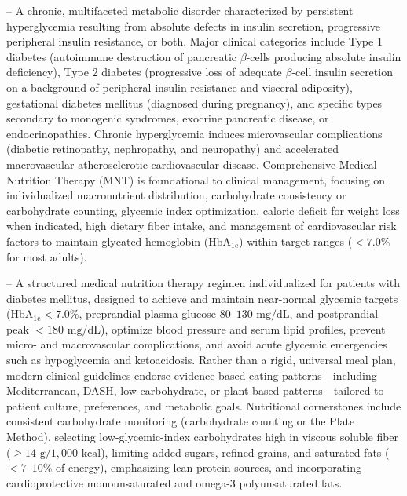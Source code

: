 -- A chronic, multifaceted metabolic disorder characterized by persistent hyperglycemia resulting from absolute defects in insulin secretion, progressive peripheral insulin resistance, or both. Major clinical categories include Type 1 diabetes (autoimmune destruction of pancreatic $\beta$-cells producing absolute insulin deficiency), Type 2 diabetes (progressive loss of adequate $\beta$-cell insulin secretion on a background of peripheral insulin resistance and visceral adiposity), gestational diabetes mellitus (diagnosed during pregnancy), and specific types secondary to monogenic syndromes, exocrine pancreatic disease, or endocrinopathies. Chronic hyperglycemia induces microvascular complications (diabetic retinopathy, nephropathy, and neuropathy) and accelerated macrovascular atherosclerotic cardiovascular disease. Comprehensive Medical Nutrition Therapy (MNT) is foundational to clinical management, focusing on individualized macronutrient distribution, carbohydrate consistency or carbohydrate counting, glycemic index optimization, caloric deficit for weight loss when indicated, high dietary fiber intake, and management of cardiovascular risk factors to maintain glycated hemoglobin ($\text{HbA}_{1\text{c}}$) within target ranges ($<7.0\%$ for most adults).

-- A structured medical nutrition therapy regimen individualized for patients with diabetes mellitus, designed to achieve and maintain near-normal glycemic targets ($\text{HbA}_{1\text{c}} < 7.0\%$, preprandial plasma glucose $80\text{--}130\text{ mg/dL}$, and postprandial peak $<180\text{ mg/dL}$), optimize blood pressure and serum lipid profiles, prevent micro- and macrovascular complications, and avoid acute glycemic emergencies such as hypoglycemia and ketoacidosis. Rather than a rigid, universal meal plan, modern clinical guidelines endorse evidence-based eating patterns---including Mediterranean, DASH, low-carbohydrate, or plant-based patterns---tailored to patient culture, preferences, and metabolic goals. Nutritional cornerstones include consistent carbohydrate monitoring (carbohydrate counting or the Plate Method), selecting low-glycemic-index carbohydrates high in viscous soluble fiber ($\ge 14\text{ g}/1{,}000\text{ kcal}$), limiting added sugars, refined grains, and saturated fats ($<7\text{--}10\%$ of energy), emphasizing lean protein sources, and incorporating cardioprotective monounsaturated and omega-3 polyunsaturated fats.

